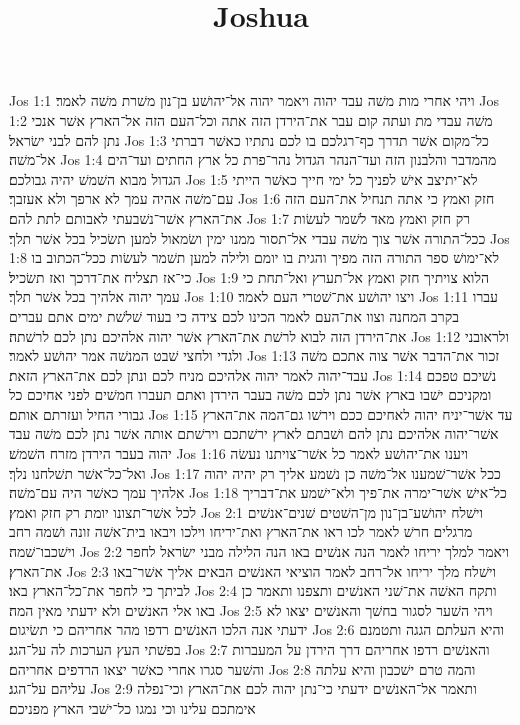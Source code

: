 

\title{Joshua}

Jos 1:1  ויהי אחרי מות משׁה עבד יהוה ויאמר יהוה אל־יהושׁע בן־נון משׁרת משׁה לאמר׃
Jos 1:2  משׁה עבדי מת ועתה קום עבר את־הירדן הזה אתה וכל־העם הזה אל־הארץ אשׁר אנכי נתן להם לבני ישׂראל׃
Jos 1:3  כל־מקום אשׁר תדרך כף־רגלכם בו לכם נתתיו כאשׁר דברתי אל־משׁה׃
Jos 1:4  מהמדבר והלבנון הזה ועד־הנהר הגדול נהר־פרת כל ארץ החתים ועד־הים הגדול מבוא השׁמשׁ יהיה גבולכם׃
Jos 1:5  לא־יתיצב אישׁ לפניך כל ימי חייך כאשׁר הייתי עם־משׁה אהיה עמך לא ארפך ולא אעזבך׃
Jos 1:6  חזק ואמץ כי אתה תנחיל את־העם הזה את־הארץ אשׁר־נשׁבעתי לאבותם לתת להם׃
Jos 1:7  רק חזק ואמץ מאד לשׁמר לעשׂות ככל־התורה אשׁר צוך משׁה עבדי אל־תסור ממנו ימין ושׂמאול למען תשׂכיל בכל אשׁר תלך׃
Jos 1:8  לא־ימושׁ ספר התורה הזה מפיך והגית בו יומם ולילה למען תשׁמר לעשׂות ככל־הכתוב בו כי־אז תצליח את־דרכך ואז תשׂכיל׃
Jos 1:9  הלוא צויתיך חזק ואמץ אל־תערץ ואל־תחת כי עמך יהוה אלהיך בכל אשׁר תלך׃
Jos 1:10  ויצו יהושׁע את־שׁטרי העם לאמר׃
Jos 1:11  עברו בקרב המחנה וצוו את־העם לאמר הכינו לכם צידה כי בעוד שׁלשׁת ימים אתם עברים את־הירדן הזה לבוא לרשׁת את־הארץ אשׁר יהוה אלהיכם נתן לכם לרשׁתה׃
Jos 1:12  ולראובני ולגדי ולחצי שׁבט המנשׁה אמר יהושׁע לאמר׃
Jos 1:13  זכור את־הדבר אשׁר צוה אתכם משׁה עבד־יהוה לאמר יהוה אלהיכם מניח לכם ונתן לכם את־הארץ הזאת׃
Jos 1:14  נשׁיכם טפכם ומקניכם ישׁבו בארץ אשׁר נתן לכם משׁה בעבר הירדן ואתם תעברו חמשׁים לפני אחיכם כל גבורי החיל ועזרתם אותם׃
Jos 1:15  עד אשׁר־יניח יהוה לאחיכם ככם וירשׁו גם־המה את־הארץ אשׁר־יהוה אלהיכם נתן להם ושׁבתם לארץ ירשׁתכם וירשׁתם אותה אשׁר נתן לכם משׁה עבד יהוה בעבר הירדן מזרח השׁמשׁ׃
Jos 1:16  ויענו את־יהושׁע לאמר כל אשׁר־צויתנו נעשׂה ואל־כל־אשׁר תשׁלחנו נלך׃
Jos 1:17  ככל אשׁר־שׁמענו אל־משׁה כן נשׁמע אליך רק יהיה יהוה אלהיך עמך כאשׁר היה עם־משׁה׃
Jos 1:18  כל־אישׁ אשׁר־ימרה את־פיך ולא־ישׁמע את־דבריך לכל אשׁר־תצונו יומת רק חזק ואמץ׃
Jos 2:1  וישׁלח יהושׁע־בן־נון מן־השׁטים שׁנים־אנשׁים מרגלים חרשׁ לאמר לכו ראו את־הארץ ואת־יריחו וילכו ויבאו בית־אשׁה זונה ושׁמה רחב וישׁכבו־שׁמה׃
Jos 2:2  ויאמר למלך יריחו לאמר הנה אנשׁים באו הנה הלילה מבני ישׂראל לחפר את־הארץ׃
Jos 2:3  וישׁלח מלך יריחו אל־רחב לאמר הוציאי האנשׁים הבאים אליך אשׁר־באו לביתך כי לחפר את־כל־הארץ באו׃
Jos 2:4  ותקח האשׁה את־שׁני האנשׁים ותצפנו ותאמר כן באו אלי האנשׁים ולא ידעתי מאין המה׃
Jos 2:5  ויהי השׁער לסגור בחשׁך והאנשׁים יצאו לא ידעתי אנה הלכו האנשׁים רדפו מהר אחריהם כי תשׂיגום׃
Jos 2:6  והיא העלתם הגגה ותטמנם בפשׁתי העץ הערכות לה על־הגג׃
Jos 2:7  והאנשׁים רדפו אחריהם דרך הירדן על המעברות והשׁער סגרו אחרי כאשׁר יצאו הרדפים אחריהם׃
Jos 2:8  והמה טרם ישׁכבון והיא עלתה עליהם על־הגג׃
Jos 2:9  ותאמר אל־האנשׁים ידעתי כי־נתן יהוה לכם את־הארץ וכי־נפלה אימתכם עלינו וכי נמגו כל־ישׁבי הארץ מפניכם׃
